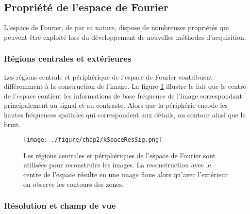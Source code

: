 \subsection{Propriété de l'espace de Fourier}

L'espace de Fourier, de par sa nature, dispose de nombreuses propriétés qui peuvent être exploité lors du développement de nouvelles méthodes d'acquisition. 

\subsubsection{Régions centrales et extérieures}
\label{subsec:KSpaceRegion}
Les régions centrale et périphérique de l'espace de Fourier contribuent différemment à la construction de l'image. La figure \ref{fig:kSpaceResSig} illustre le fait que le centre de l'espace contient les informations de base fréquence de l'image correspondant principalement au signal et au contraste. Alors que la périphérie encode les hautes fréquences spatiales qui correspondent aux détails, au contour ainsi que le bruit.

\begin{figure}[H]
\centering
\texttt{[image: ./figure/chap2/kSpaceResSig.png]}
\caption[Centre vs Extérieur]{\label{fig:kSpaceResSig} Les régions centrales et périphériques de l'espace de Fourier sont utilisées pour reconstruire les images. La reconstruction avec le centre de l'espace résulte en une image floue alors qu'avec l'extérieur on observe les contours des zones.}
\end{figure}

\subsubsection{Résolution et champ de vue}

